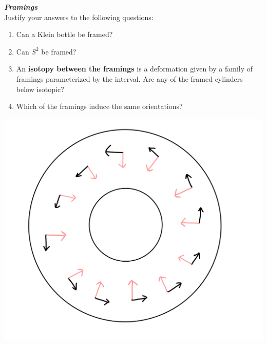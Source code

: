 \begin{exercise} \textbf{\textit{Framings}}\\
Justify your answers to the following questions:
	\begin{enumerate}[label=(\alph*)]
	\item Can a Klein bottle be framed?
	  \item Can $S^2$ be framed?
          \item An \textbf{isotopy between the framings} is a deformation given by a family of framings parameterized by the interval. 
        Are any of the framed cylinders below isotopic? 
        \item Which of the framings induce the same orientations? 
	\end{enumerate}

 \begin{center} 
		\includegraphics[scale=0.1]{images/Exercises/-1framing.jpeg}

\end{center}
\end{exercise}
